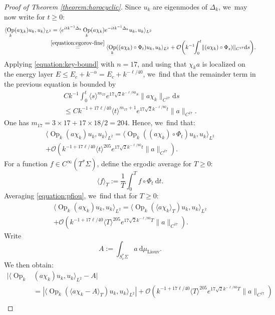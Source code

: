 \documentclass[JEP,XML,SOM,Unicode,published]{cedram}
\theoremstyle{plain}
\theoremstyle{definition}
\let\mc\mathcal
\newcommand{\dd}{\mathrm{d}}
\DeclareMathOperator{\Op}{Op}
\begin{document}
\begin{proof}[Proof of Theorem \ref{theorem:horocyclic}]
Since $u_k$ are eigenmodes of $\Delta_k$, we~may now write for $t \geq 0$:
\begin{align*}
\langle \Op_k(a \chi_k) u_k,u_k\rangle_{L^2} &= \langle e^{itk^{-1}\Delta_k} \Op_k(a \chi_k) e^{-itk^{-1}\Delta_k}u_k,u_k\rangle_{L^2} \\
& \mkern-7mu\overset{\eqref{equation:egorov-fine}}{=} \langle \Op_k((a \chi_k) \circ \Phi_t) u_k, u_k \rangle_{L^2}+ \mc{O}\biggl(k^{-1} \!\!\int_0^t\! \|(a \chi_k) \circ \Phi_s)\|_{C^{17}} \dd s\biggr).
\end{align*}
Applying \eqref{equation:key-bound} with $n=17$, and using that $\chi_k a$ is localized on the energy layer $E \leq E_c + k^{-\alpha} = E_c + k^{-\ell/40}$, we~find that the remainder term in the previous equation is bounded by
\begin{multline}
\label{equation:dingo}
C k^{-1} \int_0^t \langle s \rangle^{m_{17}} e^{17 \sqrt{2}k^{-\ell/80} s} \|a \chi_k\|_{C^{17}} \dd s\\
\leq C k^{-1+17\ell/40} \langle t\rangle^{m_{17}+1} e^{17\sqrt{2}k^{-\ell/80} t} \|a\|_{C^{17}}.
\end{multline}
One has $m_{17} = 3 \times 17+ 17\times 18/2 = 204$. Hence, we~find that:
\begin{multline}
\label{equation:pfiou}
\langle \Op_k(a \chi_k) u_k,u_k\rangle_{L^2} = \langle \Op_k((a \chi_k) \circ \Phi_t) u_k, u_k \rangle_{L^2} \\
+ \mc{O}(k^{-1+17\ell/40} \langle t\rangle^{205} e^{17\sqrt{2}k^{-\ell/80} t} \|a\|_{C^{17}}).
\end{multline}
For a function $f \in C^\infty(T^*\Sigma)$, define the ergodic average for $T \geq 0$:
\[
\langle f \rangle_T := \dfrac{1}{T} \int_0^T f \circ \Phi_t ~\dd t.
\]
Averaging \eqref{equation:pfiou}, we~find that for $T \geq 0$:
\begin{multline*}
\langle \Op_k(a \chi_k) u_k,u_k\rangle_{L^2} = \langle \Op_k(\langle a \chi_k\rangle_T) u_k, u_k \rangle_{L^2} \\
+ \mc{O}(k^{-1+17\ell/40} \langle T\rangle^{205} e^{17\sqrt{2}k^{-\ell/80} T} \|a\|_{C^{17}}).
\end{multline*}
Write
\[
A := \int_{S^*_c\Sigma} a~ \dd \mu_{\mathrm{Liouv}}.
\]
We then obtain:
\[
\begin{split}
|\langle \Op_k&(a \chi_k) u_k,u_k\rangle_{L^2} - A| \\
&= |\langle \Op_k\left(\langle a \chi_k- A\rangle_T\right) u_k, u_k \rangle_{L^2}| + \mc{O}(k^{-1+17\ell/40} \langle T\rangle^{205} e^{17\sqrt{2}k^{-\ell/80} T} \|a\|_{C^{17}}) \\

\end{split}\]
\end{proof}
\end{document}
